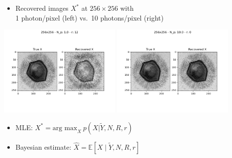 \documentclass[9pt]{report}
\begin{document}
\begin{itemize}
\item Recovered images $X^*$ at $256 \times 256$ with
  \\ 1 photon/pixel (left)
  vs.\ 10 photons/pixel (right)
\end{itemize}
\begin{center}
  \includegraphics[width=0.45\textwidth]{img/fft/recover-256-1.png}
  \includegraphics[width=0.45\textwidth]{img/fft/recover-256-10.png}
\end{center}
\vspace*{-12pt}
\begin{itemize}
\item MLE: $X^* = \textrm{arg max}_{X} \ p(X | \tilde{Y}, N, R,
  r)$
\item Bayesian estimate: $\widehat{X} = \mathbb{E}[X \mid \tilde{Y},
  N, R, r]$
\end{itemize}

  
\end{document}
